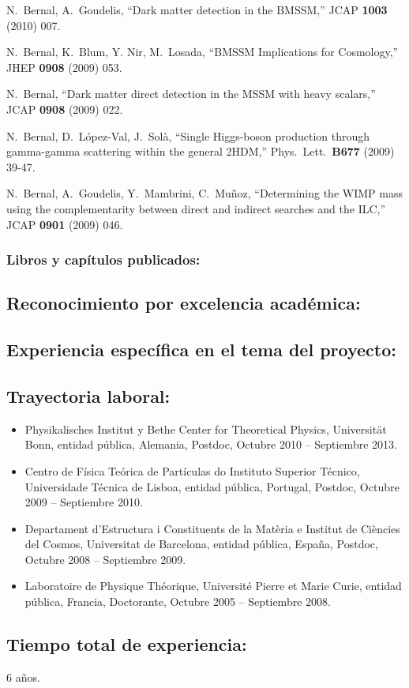   N.~Bernal, A.~Goudelis,
  ``Dark matter detection in the BMSSM,''
  JCAP {\bf 1003 } (2010)  007.

  N.~Bernal, K.~Blum, Y. Nir, M.~Losada,
  ``BMSSM Implications for Cosmology,''
  JHEP {\bf 0908 } (2009)  053.

  N.~Bernal,
  ``Dark matter direct detection in the MSSM with heavy scalars,''
  JCAP {\bf 0908 } (2009)  022.

  N.~Bernal, D.~López-Val, J.~Solà,
  ``Single Higgs-boson production through gamma-gamma scattering within the general 2HDM,''
  Phys.\ Lett.\  {\bf B677 } (2009)  39-47.

  N.~Bernal, A.~Goudelis, Y.~Mambrini, C.~Muñoz,
  ``Determining the WIMP mass using the complementarity between direct and indirect searches and the ILC,''
  JCAP {\bf 0901 } (2009)  046.
\subsubsection{Libros y capítulos publicados:}
\subsection{Reconocimiento por excelencia académica:}
\subsection{Experiencia específica en el tema del proyecto:}
\subsection{Trayectoria laboral:}
\begin{itemize}
\item Physikalisches Institut y Bethe Center for Theoretical Physics, Universität Bonn, entidad pública, Alemania, Postdoc, Octubre 2010 -- Septiembre 2013.
\item Centro de Física Teórica de Partículas do Instituto Superior Técnico, Universidade Técnica de Lisboa, entidad pública, Portugal, Postdoc, Octubre 2009 -- Septiembre 2010.
\item Departament d'Estructura i Constituents de la Matèria e Institut de Ciències del Cosmos, Universitat de Barcelona, entidad pública, España, Postdoc, Octubre 2008 -- Septiembre 2009.
\item Laboratoire de Physique Théorique, Université Pierre et Marie Curie, entidad pública, Francia, Doctorante, Octubre 2005 -- Septiembre 2008.
\end{itemize}
\subsection{Tiempo total de experiencia:}
6 años.


